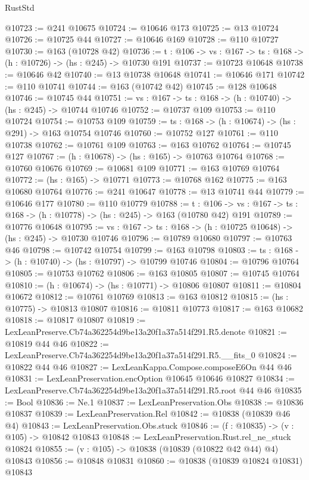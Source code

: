 \begin{lexlean}{RustStd}
\begin{coremodule}
@10723 := @241 @10675
@10724 := @10646 @173
@10725 := @13 @10724
@10726 := @10725 @44
@10727 := @10646 @169
@10728 := @110 @10727
@10730 := @163 (@10728 @42)
@10736 := {t : @106} -> {vs : @167} -> {ts : @168} -> (h : @10726) -> (hs : @245) -> @10730 @191
@10737 := @10723 @10648
@10738 := @10646 @42
@10740 := @13 @10738 @10648
@10741 := @10646 @171
@10742 := @110 @10741
@10744 := @163 (@10742 @42)
@10745 := @128 @10648
@10746 := @10745 @44
@10751 := {vs : @167} -> {ts : @168} -> (h : @10740) -> (hs : @245) -> @10744 @10746
@10752 := @10737 @109
@10753 := @110 @10724
@10754 := @10753 @109
@10759 := {ts : @168} -> (h : @10674) -> (hs : @291) -> @163 @10754 @10746
@10760 := @10752 @127
@10761 := @110 @10738
@10762 := @10761 @109
@10763 := @163 @10762
@10764 := @10745 @127
@10767 := (h : @10678) -> (hs : @165) -> @10763 @10764
@10768 := @10760 @10676
@10769 := @10681 @109
@10771 := @163 @10769 @10764
@10772 := (hs : @165) -> @10771
@10773 := @10768 @162
@10775 := @163 @10680 @10764
@10776 := @241 @10647
@10778 := @13 @10741 @44
@10779 := @10646 @177
@10780 := @110 @10779
@10788 := {t : @106} ->
  {vs : @167} -> {ts : @168} -> (h : @10778) -> (hs : @245) -> @163 (@10780 @42) @191
@10789 := @10776 @10648
@10795 := {vs : @167} -> {ts : @168} -> (h : @10725 @10648) -> (hs : @245) -> @10730 @10746
@10796 := @10789 @10680
@10797 := @10763 @46
@10798 := @10742 @10754
@10799 := @163 @10798
@10803 := {ts : @168} -> (h : @10740) -> (hs : @10797) -> @10799 @10746
@10804 := @10796 @10764
@10805 := @10753 @10762
@10806 := @163 @10805
@10807 := @10745 @10764
@10810 := (h : @10674) -> (hs : @10771) -> @10806 @10807
@10811 := @10804 @10672
@10812 := @10761 @10769
@10813 := @163 @10812
@10815 := (hs : @10775) -> @10813 @10807
@10816 := @10811 @10773
@10817 := @163 @10682
@10818 := @10817 @10807
@10819 := LexLeanPreserve.Cb74a362254d9be13a20f1a37a514f291.R5.denote
@10821 := @10819 @44 @46
@10822 := LexLeanPreserve.Cb74a362254d9be13a20f1a37a514f291.R5.__fits_0
@10824 := @10822 @44 @46
@10827 := LexLeanKappa.Compose.composeE6On @44 @46
@10831 := LexLeanPreservation.encOption @10645 @10646 @10827
@10834 := LexLeanPreserve.Cb74a362254d9be13a20f1a37a514f291.R5.root @44 @46
@10835 := Bool
@10836 := Ne.{1}
@10837 := LexLeanPreservation.Obs
@10838 := @10836 @10837
@10839 := LexLeanPreservation.Rel
@10842 := @10838 (@10839 @46 @4)
@10843 := LexLeanPreservation.Obs.stuck
@10846 := (f : @10835) -> (v : @105) -> @10842 @10843
@10848 := LexLeanPreservation.Rust.rel_ne_stuck @10824
@10855 := (v : @105) -> @10838 (@10839 (@10822 @42 @44) @4) @10843
@10856 := @10848 @10831
@10860 := @10838 (@10839 @10824 @10831) @10843

\end{coremodule}
\end{lexlean}
